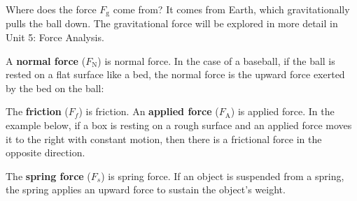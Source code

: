 \documentclass[dvipsnames]{article}
\begin{document}
Where does the force $F_\mathrm{g}$ come from? It comes from Earth, which gravitationally pulls the ball down. The gravitational force will be explored in more detail in Unit 5: Force Analysis.

A \textbf{\gls{normal force}} ($F_\text{N}$) is \glsdesc{normal force}. In the case of a baseball, if the ball is rested on a flat surface like a bed, the normal force is the upward force exerted by the bed on the ball:

\begin{center}
\end{center}


The \textbf{\gls{friction}} ($F_f$) is \glsdesc{friction}. An \textbf{\gls{applied force}} ($F_\mathrm{A}$) is \glsdesc{applied force}. In the example below, if a box is resting on a rough surface and an applied force moves it to the right with constant motion, then there is a frictional force in the opposite direction.

\begin{center}
\end{center}

The \textbf{\gls{spring force}} ($F_s$) is \glsdesc{spring force}. If an object is suspended from a spring, the spring applies an upward force to sustain the object's weight.

\begin{center}
\end{center}
\end{document}
